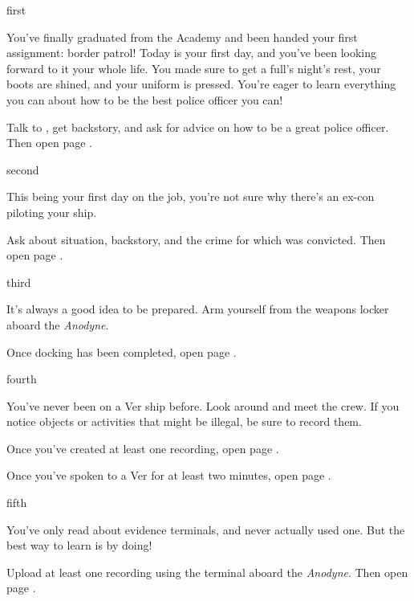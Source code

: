 \documentclass[greennotebook]{guildcamp4} %
\begin{document}
\startnotebook{\nCgoodNotebook{}}

\begin{page}{first}

You've finally graduated from the Academy and been handed your first assignment: border patrol! Today is your first day, and you've been looking forward to it your whole life. You made sure to get a full's night's rest, your boots are shined, and your uniform is pressed. You're eager to learn everything you can about how to be the best police officer you can!

Talk to \cCbad{}, get  backstory, and ask for  advice on how to be a great police officer. Then open page .

\end{page}

\begin{page}{second}

This being your first day on the job, you're not sure why there's an ex-con piloting your ship. 

Ask \cPilot{} about  situation,  backstory, and the crime for which  was convicted. Then open page .

\end{page}

\begin{page}{third}

It's always a good idea to be prepared. Arm yourself from the weapons locker aboard the \emph{Anodyne}.

Once docking has been completed, open page .

\end{page}

\begin{page}{fourth}

You've never been on a Ver ship before. Look around and meet the crew. If you notice objects or activities that might be illegal, be sure to record them.

Once you've created at least one recording, open page .

Once you've spoken to a Ver for at least two minutes, open page .

\end{page}

\begin{page}{fifth}

You've only read about evidence terminals, and never actually used one. But the best way to learn is by doing!

Upload at least one recording using the terminal aboard the \emph {Anodyne}. Then open page .

\end{page}
\end{document}
